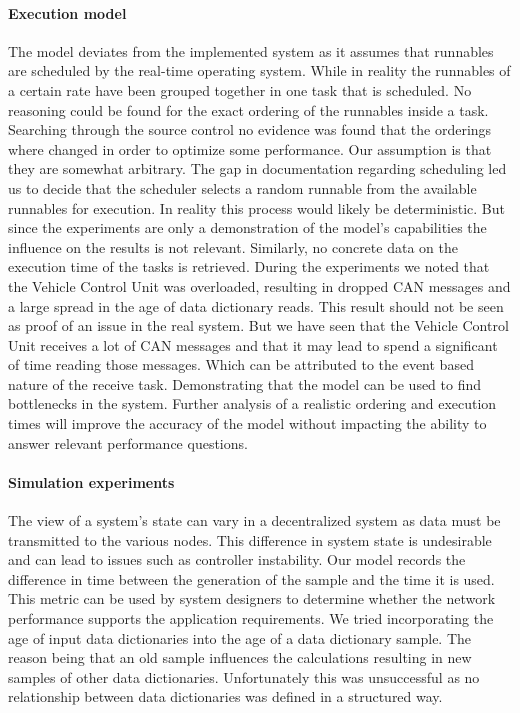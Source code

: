 \paragraph{Execution model}
The model deviates from the implemented system as it assumes that runnables are scheduled by the real-time operating system. While in reality the runnables of a certain rate have been grouped together in one task that is scheduled. No reasoning could be found for the exact ordering of the runnables inside a task. Searching through the source control no evidence was found that the orderings where changed in order to optimize some performance. Our assumption is that they are somewhat arbitrary. The gap in documentation regarding scheduling led us to decide that the scheduler selects a random runnable from the available runnables for execution. In reality this process would likely be deterministic. But since the experiments are only a demonstration of the model's capabilities the influence on the results is not relevant. Similarly, no concrete data on the execution time of the tasks is retrieved. During the experiments we noted that the Vehicle Control Unit was overloaded, resulting in dropped CAN messages and a large spread in the age of data dictionary reads. This result should not be seen as proof of an issue in the real system. But we have seen that the Vehicle Control Unit receives a lot of CAN messages and that it may lead to spend a significant of time reading those messages. Which can be attributed to the event based nature of the receive task. Demonstrating that the model can be used to find bottlenecks in the system. Further analysis of a realistic ordering and execution times will improve the accuracy of the model without impacting the ability to answer relevant performance questions.

\paragraph{Simulation experiments}
The view of a system's state can vary in a decentralized system as data must be transmitted to the various nodes. This difference in system state is undesirable and can lead to issues such as controller instability. Our model records the difference in time between the generation of the sample and the time it is used. This metric can be used by system designers to determine whether the network performance supports the application requirements. We tried incorporating the age of input data dictionaries into the age of a data dictionary sample. The reason being that an old sample influences the calculations resulting in new samples of other data dictionaries. Unfortunately this was unsuccessful as no relationship between data dictionaries was defined in a structured way.

